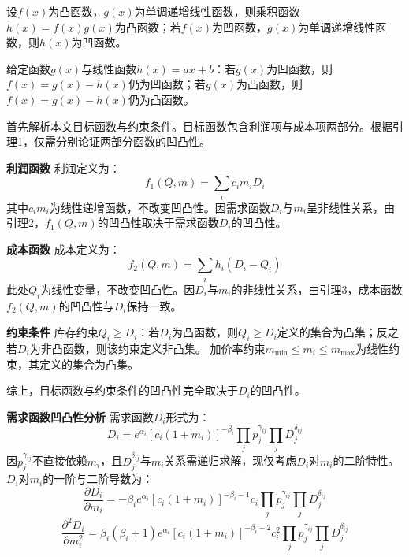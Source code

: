 \documentclass[lang=cn,12pt,a4paper]{elegantpaper}
\begin{document}
    \begin{lemma}[单调函数与凹凸函数的乘积规则]
        设$f(x)$为凸函数，$g(x)$为单调递增线性函数，则乘积函数$h(x) = f(x) g(x)$为凸函数；若$f(x)$为凹函数，$g(x)$为单调递增线性函数，则$h(x)$为凹函数。
    \end{lemma}
    
    \begin{lemma}[线性函数的凹凸性传递]
        给定函数$g(x)$与线性函数$h(x) = ax + b$：若$g(x)$为凹函数，则$f(x) = g(x) - h(x)$仍为凹函数；若$g(x)$为凸函数，则$f(x) = g(x) - h(x)$仍为凸函数。
    \end{lemma}

首先解析本文目标函数与约束条件。目标函数包含利润项与成本项两部分。根据引理1，仅需分别论证两部分函数的凹凸性。

\textbf{利润函数}
利润定义为：
\begin{equation}
f_1(Q, m) = \sum_i c_i m_i D_i
\end{equation}
其中$c_i m_i$为线性递增函数，不改变凹凸性。因需求函数$D_i$与$m_i$呈非线性关系，由引理2，$f_1(Q, m)$的凹凸性取决于需求函数$D_i$的凹凸性。

\textbf{成本函数}
成本定义为：
\begin{equation}
f_2(Q, m) = \sum_i h_i (D_i - Q_i)
\end{equation}
此处$Q_i$为线性变量，不改变凹凸性。因$D_i$与$m_i$的非线性关系，由引理3，成本函数$f_2(Q, m)$的凹凸性与$D_i$保持一致。

\textbf{约束条件}
库存约束$Q_i \geq D_i$：若$D_i$为凸函数，则$Q_i \geq D_i$定义的集合为凸集；反之若$D_i$为非凸函数，则该约束定义非凸集。
加价率约束$m_{\min} \leq m_i \leq m_{\max}$为线性约束，其定义的集合为凸集。

综上，目标函数与约束条件的凹凸性完全取决于$D_i$的凹凸性。

\textbf{需求函数凹凸性分析}
需求函数$D_i$形式为：
\begin{equation}
D_i = e^{\alpha_i} \left[ c_i (1 + m_i) \right]^{-\beta_i} \prod_j p_j^{\gamma_{ij}} \prod_j D_j^{\delta_{ij}}
\end{equation}
因$p_j^{\gamma_{ij}}$不直接依赖$m_i$，且$D_j^{\delta_{ij}}$与$m_i$关系需递归求解，现仅考虑$D_i$对$m_i$的二阶特性。$D_i$对$m_i$的一阶与二阶导数为：
\begin{equation}
\frac{\partial D_i}{\partial m_i} = -\beta_i e^{\alpha_i} \left[ c_i (1 + m_i) \right]^{-\beta_i - 1} c_i \prod_j p_j^{\gamma_{ij}} \prod_j D_j^{\delta_{ij}}
\end{equation}
\begin{equation}
\frac{\partial^2 D_i}{\partial m_i^2} = \beta_i (\beta_i + 1) e^{\alpha_i} \left[ c_i (1 + m_i) \right]^{-\beta_i - 2} c_i^2 \prod_j p_j^{\gamma_{ij}} \prod_j D_j^{\delta_{ij}}
\end{equation}
\end{document}
